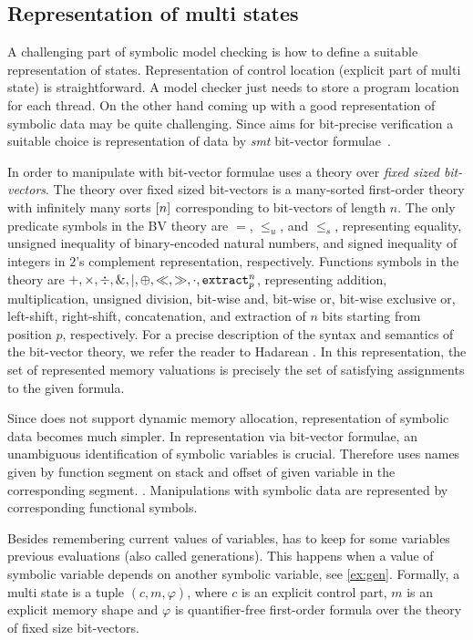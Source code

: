 \subsection{Representation of multi states} \label{sec:multistates}

A challenging part of symbolic model checking is how to define a suitable
representation of states. Representation of control location (explicit part of
multi state) is straightforward. A model checker just needs to store
a program location for each thread. On the other hand coming up with a good
representation of symbolic data may be quite challenging. Since \DIVINE aims
for bit-precise verification a suitable choice is representation of data
by \emph{smt} bit-vector formulae~\cite{Bauch14}.

In order to manipulate with bit-vector formulae \SymDIVINE uses a theory over
\emph{fixed sized bit-vectors}. The theory over fixed sized bit-vectors is a many-sorted
first-order theory with infinitely many sorts $[n]$ corresponding
to bit-vectors of length $n$. The only predicate symbols in the BV theory
are $=$, $\leq_u$, and $\leq_s$, representing
equality, unsigned inequality of binary-encoded natural numbers, and
signed inequality of integers in $2$'s complement representation,
respectively. Functions symbols in the theory are
$+, \times, \div, \&, \mid, \oplus, \ll, \gg, \cdot, \texttt{extract}^{n}_{p}$,
representing addition, multiplication, unsigned division, bit-wise
and, bit-wise or, bit-wise exclusive or, left-shift, right-shift,
concatenation, and extraction of $n$ bits starting from position $p$,
respectively. For a precise description of the syntax and semantics of the bit-vector
theory, we refer the reader to Hadarean \cite{Hadarean14}. In this representation,
the set of represented memory valuations is precisely the set of satisfying assignments
to the given formula.

Since \SymDIVINE does not support dynamic memory allocation, representation
of symbolic data becomes much simpler. In representation via bit-vector
\SMT formulae, an unambiguous identification of symbolic variables is crucial.
Therefore \SymDIVINE uses names given by function
segment on stack and offset of given variable in the corresponding segment. \cite{Mrazek16}.
Manipulations with symbolic data are represented by corresponding functional symbols.

Besides remembering current values of variables, \SymDIVINE has to keep for
some variables previous evaluations (also called generations). This happens when
a value of symbolic variable depends on another symbolic variable, see \autoref{ex:gen}. Formally,
a multi state is a tuple $(c, m, \varphi)$, where $c$ is an explicit control part, $m$ is an
explicit memory shape and $\varphi$ is quantifier-free first-order formula over the theory of fixed size
bit-vectors.

